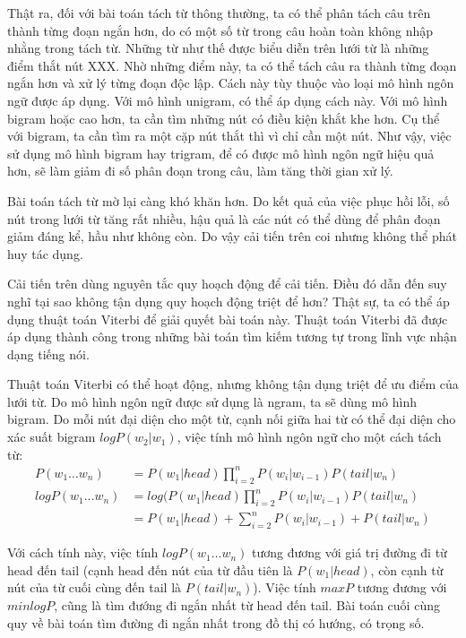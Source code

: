 \documentclass[a4paper,oneside,14pt]{extbook} %
\begin{document}
Thật ra, đối với bài toán tách từ thông thường, ta có thể phân tách
câu trên thành từng đoạn ngắn hơn, do có một số từ trong câu hoàn toàn
không nhập nhằng trong tách từ. Những từ như thế được biểu diễn trên
lưới từ là những điểm thắt nút XXX. Nhờ những điểm này, ta có thể tách
câu ra thành từng đoạn ngắn hơn và xử lý từng đoạn độc lập. Cách này
tùy thuộc vào loại mô hình ngôn ngữ được áp dụng. Với mô hình unigram,
có thể áp dụng cách này. Với mô hình bigram hoặc cao hơn, ta cần tìm
những nút có điều kiện khắt khe hơn. Cụ thể với bigram, ta cần tìm ra
một cặp nút thắt thì vì chỉ cần một nút. Như vậy, việc sử dụng mô hình
bigram hay trigram, để có được mô hình ngôn ngữ hiệu quả hơn,  sẽ làm
giảm đi số phân đoạn trong câu, làm tăng thời gian xử lý.

Bài toán tách từ mờ lại càng khó khăn hơn. Do kết quả của việc phục
hồi lỗi, số nút trong lưới từ tăng rất nhiều, hậu quả là các nút có
thể dùng để phân đoạn giảm đáng kể, hầu như không còn. Do vậy cải tiến
trên coi nhưng không thể phát huy tác dụng.

Cải tiến trên dùng nguyên tắc quy hoạch động để cải tiến. Điều đó dẫn
đến suy nghĩ tại sao không tận dụng quy hoạch động triệt để hơn? Thật
sự, ta có thể áp dụng thuật toán Viterbi để giải quyết bài toán
này. Thuật toán Viterbi đã được áp dụng thành công trong những bài
toán tìm kiếm tương tự trong lĩnh vực nhận dạng tiếng nói.

Thuật toán Viterbi có thể hoạt động, nhưng không tận dụng triệt để ưu
điểm của lưới từ. Do mô hình ngôn ngữ được sử dụng là ngram, ta sẽ
dùng mô hình bigram. Do mỗi nút đại diện cho một từ, cạnh nối giữa hai
từ có thể đại diện cho xác suất bigram $logP(w_2|w_1)$, việc tính mô
hình ngôn ngữ cho một cách tách từ:
\begin{align}
  P(w_1\ldots w_n)&= P(w_1|head)\prod_{i=2}^nP(w_i|w_{i-1})P(tail|w_n)\\
  logP(w_1\ldots w_n)&= log(P(w_1|head)\prod_{i=2}^nP(w_i|w_{i-1})P(tail|w_n)\\
  &=P(w_1|head)+\sum_{i=2}^nP(w_i|w_{i-1})+P(tail|w_n)
\end{align}

Với cách tính này, việc tính $logP(w_1\ldots w_n)$ tương đương với giá
trị đường đi từ head đến tail (cạnh head đến nút của từ đầu tiên là
$P(w_1|head)$, còn cạnh từ nút của từ cuối cùng đến tail là
$P(tail|w_n)$). Việc tính $maxP$ tương đương với $minlogP$, cũng là
tìm đướng đi ngắn nhất từ head đến tail. Bài toán cuối cùng quy về bài
toán tìm đường đi ngắn nhất trong đồ thị có hướng, có trọng số.
\end{document}

